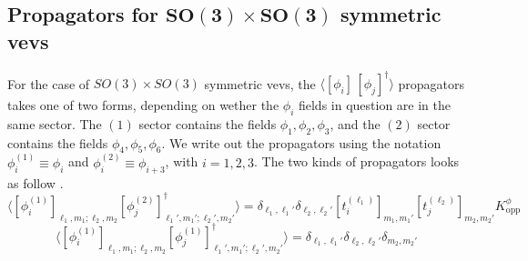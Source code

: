 \subsection[Propagators for $SO(3) \times SO(3)$ symmetric vevs]{Propagators for $\mathbf{SO(3) \times SO(3)}$ symmetric vevs}
For the case of $SO(3) \times SO(3)$ symmetric vevs, the $\langle [\phi_i] \, [\phi_j]^\dagger \rangle$ propagators takes one of two forms, depending on wether the $\phi_i$ fields in question are in the same sector. The $(1)$ sector  contains the fields $\phi_1, \phi_2, \phi_3$, and the $(2)$ sector contains the fields $\phi_4, \phi_5, \phi_6$. We write out the propagators using the notation $\phi_i^{(1)} \equiv \phi_i$ and $\phi_i^{(2)} \equiv \phi_{i+3}$, with $i=1,2,3$. The two kinds of propagators looks as follow \cite{One-point functions in D3-D7}.
%
%
\begin{equation}
\langle [\phi_i^{(1)}]_{\ell_1,m_1;\ell_2,m_2} [\phi_j^{(2)}]_{\ell_1',m_1';\ell_2',m_2'}^\dagger \rangle
=
\delta_{\ell_1,\ell_1'} \delta_{\ell_2, \ell_2'}
[t_i^{(\ell_1)}]_{m_1,m_1'} [t_j^{(\ell_2)}]_{m_2,m_2'}
K^{\phi}_{\text{opp}}
\end{equation}
%
%
\begin{equation*}
\langle [\phi_i^{(1)}]_{\ell_1,m_1;\ell_2,m_2} [\phi_j^{(1)}]_{\ell_1',m_1';\ell_2',m_2'}^\dagger \rangle
=
\delta_{\ell_1,\ell_1'} \delta_{\ell_2, \ell_2'} \delta_{m_2,m_2'}
\end{equation*}
%
%


